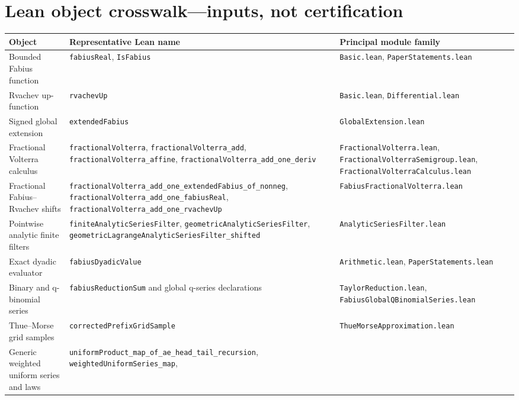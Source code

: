 \documentclass[11pt,oneside]{article}
\theoremstyle{definition}
\theoremstyle{remark}
\begin{document}
\section*{Lean object crosswalk---inputs, not certification}
\begin{longtable}{@{}p{}p{}p{}@{}}
\toprule
Object & Representative Lean name & Principal module family \\
\midrule
\endhead
Bounded Fabius function & \nolinkurl{fabiusReal}, \nolinkurl{IsFabius} & \nolinkurl{Basic.lean}, \nolinkurl{PaperStatements.lean} \\
Rvachev up-function & \nolinkurl{rvachevUp} & \nolinkurl{Basic.lean}, \nolinkurl{Differential.lean} \\
Signed global extension & \nolinkurl{extendedFabius} & \nolinkurl{GlobalExtension.lean} \\
Fractional Volterra calculus &
\nolinkurl{fractionalVolterra}, \nolinkurl{fractionalVolterra_add},
\nolinkurl{fractionalVolterra_affine}, \nolinkurl{fractionalVolterra_add_one_deriv} &
\nolinkurl{FractionalVolterra.lean}, \nolinkurl{FractionalVolterraSemigroup.lean},
\nolinkurl{FractionalVolterraCalculus.lean} \\
Fractional Fabius--Rvachev shifts &
\nolinkurl{fractionalVolterra_add_one_extendedFabius_of_nonneg},
\nolinkurl{fractionalVolterra_add_one_fabiusReal},
\nolinkurl{fractionalVolterra_add_one_rvachevUp} &
\nolinkurl{FabiusFractionalVolterra.lean} \\
Pointwise analytic finite filters &
\nolinkurl{finiteAnalyticSeriesFilter},
\nolinkurl{geometricAnalyticSeriesFilter},
\nolinkurl{geometricLagrangeAnalyticSeriesFilter_shifted} &
\nolinkurl{AnalyticSeriesFilter.lean} \\
Exact dyadic evaluator & \nolinkurl{fabiusDyadicValue} & \nolinkurl{Arithmetic.lean}, \nolinkurl{PaperStatements.lean} \\
Binary and q-binomial series & \nolinkurl{fabiusReductionSum} and global q-series declarations & \nolinkurl{TaylorReduction.lean}, \nolinkurl{FabiusGlobalQBinomialSeries.lean} \\
Thue--Morse grid samples & \nolinkurl{correctedPrefixGridSample} & \nolinkurl{ThueMorseApproximation.lean} \\
Generic weighted uniform series and laws &
\nolinkurl{uniformProduct_map_of_ae_head_tail_recursion},
\nolinkurl{weightedUniformSeries_map},

\end{longtable}
\end{document}
